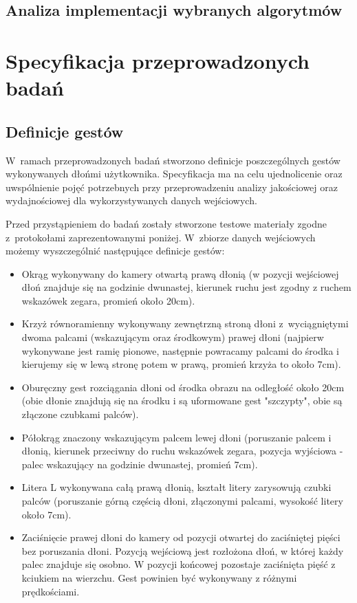 \section{Analiza implementacji wybranych algorytmów}

\chapter{Specyfikacja przeprowadzonych badań}\label{Chapter_SpecyfikacjaPrzeprowadzonychBadan}

\section{Definicje gestów}\label{Section_DefinicjeGestow}

W~ramach przeprowadzonych badań stworzono definicje poszczególnych gestów wykonywanych dłońmi użytkownika. Specyfikacja ma na celu ujednolicenie oraz uwspólnienie pojęć potrzebnych przy przeprowadzeniu analizy jakościowej oraz wydajnościowej dla wykorzystywanych danych wejściowych.

Przed przystąpieniem do badań zostały stworzone testowe materiały zgodne z~protokołami zaprezentowanymi poniżej. W~zbiorze danych wejściowych możemy wyszczególnić następujące definicje gestów:

\begin{itemize}
  \item Okrąg wykonywany do kamery otwartą prawą dłonią (w pozycji wejściowej dłoń znajduje się na godzinie dwunastej, kierunek ruchu jest zgodny z ruchem wskazówek zegara, promień około 20cm).
  \item Krzyż równoramienny wykonywany zewnętrzną stroną dłoni z~wyciągniętymi dwoma palcami (wskazującym oraz środkowym) prawej dłoni (najpierw wykonywane jest ramię pionowe, następnie powracamy palcami do środka i kierujemy się w lewą stronę potem w prawą, promień krzyża to około 7cm).
  \item Oburęczny gest rozciągania dłoni od środka obrazu na odległość około 20cm (obie dłonie znajdują się na środku i są uformowane gest "szczypty", obie są złączone czubkami palców).
  \item Półokrąg znaczony wskazującym palcem lewej dłoni (poruszanie palcem i dłonią, kierunek przeciwny do ruchu wskazówek zegara, pozycja wyjściowa - palec wskazujący na godzinie dwunastej, promień 7cm).
  \item Litera L wykonywana całą prawą dłonią, kształt litery zarysowują czubki palców (poruszanie górną częścią dłoni, złączonymi palcami, wysokość litery około 7cm).
  \item Zaciśnięcie prawej dłoni do kamery od pozycji otwartej do zaciśniętej pięści bez poruszania dłoni. Pozycją wejściową jest rozłożona dłoń, w której każdy palec znajduje się osobno. W pozycji końcowej pozostaje zaciśnięta pięść z kciukiem na wierzchu. Gest powinien być wykonywany z różnymi prędkościami.
\end{itemize}

